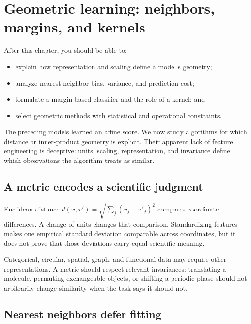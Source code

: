 \chapter{Geometric learning: neighbors, margins, and kernels}
\label{ch:geometric-learning}

\begin{learningobjectives}
After this chapter, you should be able to:
\begin{itemize}
  \item explain how representation and scaling define a model's geometry;
  \item analyze nearest-neighbor bias, variance, and prediction cost;
  \item formulate a margin-based classifier and the role of a kernel; and
  \item select geometric methods with statistical and operational constraints.
\end{itemize}
\end{learningobjectives}

\begin{chapterconnection}
The preceding models learned an affine score. We now study algorithms for which
distance or inner-product geometry is explicit. Their apparent lack of feature
engineering is deceptive: units, scaling, representation, and invariance define
which observations the algorithm treats as similar.
\end{chapterconnection}

\section{A metric encodes a scientific judgment}

Euclidean distance
$d(x,x')=\sqrt{\sum_j(x_j-x'_j)^2}$ compares coordinate differences. A change
of units changes that comparison. Standardizing features makes one empirical
standard deviation comparable across coordinates, but it does not prove that
those deviations carry equal scientific meaning.

Categorical, circular, spatial, graph, and functional data may require other
representations. A metric should respect relevant invariances: translating a
molecule, permuting exchangeable objects, or shifting a periodic phase should
not arbitrarily change similarity when the task says it should not.

\section{Nearest neighbors defer fitting}

